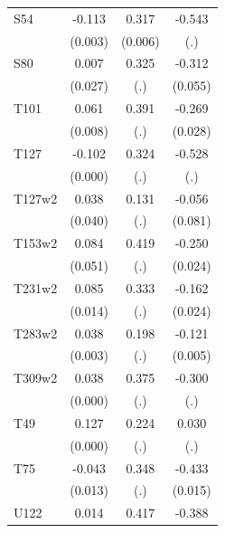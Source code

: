 \begin{table}[htbp]
\begin{tabular}{l*{3}{c}}
S54             &   -0.113\sym{***}&    0.317\sym{***}&   -0.543         \\
                &  (0.003)         &  (0.006)         &      (.)         \\
S80             &    0.007         &    0.325         &   -0.312\sym{***}\\
                &  (0.027)         &      (.)         &  (0.055)         \\
T101            &    0.061\sym{***}&    0.391         &   -0.269\sym{***}\\
                &  (0.008)         &      (.)         &  (0.028)         \\
T127            &   -0.102\sym{***}&    0.324         &   -0.528         \\
                &  (0.000)         &      (.)         &      (.)         \\
T127w2          &    0.038         &    0.131         &   -0.056         \\
                &  (0.040)         &      (.)         &  (0.081)         \\
T153w2          &    0.084         &    0.419         &   -0.250\sym{***}\\
                &  (0.051)         &      (.)         &  (0.024)         \\
T231w2          &    0.085\sym{***}&    0.333         &   -0.162\sym{***}\\
                &  (0.014)         &      (.)         &  (0.024)         \\
T283w2          &    0.038\sym{***}&    0.198         &   -0.121\sym{***}\\
                &  (0.003)         &      (.)         &  (0.005)         \\
T309w2          &    0.038\sym{***}&    0.375         &   -0.300         \\
                &  (0.000)         &      (.)         &      (.)         \\
T49             &    0.127\sym{***}&    0.224         &    0.030         \\
                &  (0.000)         &      (.)         &      (.)         \\
T75             &   -0.043\sym{***}&    0.348         &   -0.433\sym{***}\\
                &  (0.013)         &      (.)         &  (0.015)         \\
U122            &    0.014         &    0.417         &   -0.388\sym{***}\\

\end{tabular}
\end{table}
